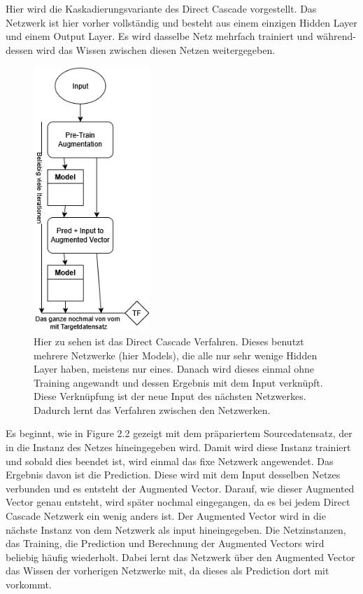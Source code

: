 Hier wird die Kaskadierungsvariante des Direct Cascade vorgestellt. 
Das Netzwerk ist hier vorher vollständig und besteht aus einem einzigen Hidden Layer und einem Output Layer. 
Es wird dasselbe Netz mehrfach trainiert und während-dessen wird das Wissen zwischen diesen Netzen weitergegeben. 

\begin{figure}[htpb]
    \centering
    \includegraphics[height=10cm]{../../Graphiken/direct_cascade.png}
    \caption{\label{fig:directcascade} 
    \small{Hier zu sehen ist das Direct Cascade Verfahren. Dieses benutzt mehrere Netzwerke (hier Models), die alle nur sehr wenige 
    Hidden Layer haben, meistens nur eines. Danach wird dieses einmal ohne Training angewandt und dessen Ergebnis mit dem Input verknüpft. 
    Diese Verknüpfung ist der neue Input des nächsten Netzwerkes. Dadurch lernt das Verfahren zwischen den Netzwerken. }}
\end{figure}

Es beginnt, wie in Figure 2.2 gezeigt mit dem präpariertem Sourcedatensatz, der in die Instanz des Netzes hineingegeben wird. 
Damit wird diese Instanz trainiert und sobald dies beendet ist, wird einmal das fixe Netzwerk angewendet. Das Ergebnis davon ist 
die Prediction. Diese wird mit dem Input desselben Netzes verbunden und es entsteht der Augmented Vector. Darauf, wie dieser Augmented 
Vector genau entsteht, wird später nochmal eingegangen, da es bei jedem Direct Cascade Netzwerk ein wenig anders ist. Der Augmented 
Vector wird in die nächste Instanz von dem Netzwerk als input hineingegeben. Die Netzinstanzen, das Training, die Prediction und 
Berechnung der Augmented Vectors wird beliebig häufig wiederholt. Dabei lernt das Netzwerk über den Augmented Vector das Wissen 
der vorherigen Netzwerke mit, da dieses als Prediction dort mit vorkommt. 

